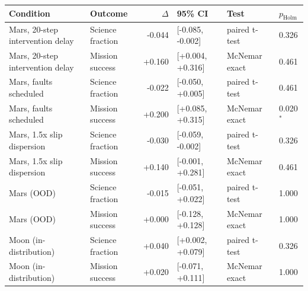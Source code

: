 \begin{tabular}{@{}llr@{~}lll@{}}
\toprule
Condition & Outcome & $\Delta$ & 95\% CI & Test & $p_{\mathrm{Holm}}$ \\
\midrule
Mars, 20-step intervention delay & Science fraction & -0.044 & [-0.085, -0.002] & paired t-test & 0.326 \\
Mars, 20-step intervention delay & Mission success & +0.160 & [+0.004, +0.316] & McNemar exact & 0.461 \\
Mars, faults scheduled & Science fraction & -0.022 & [-0.050, +0.005] & paired t-test & 0.461 \\
Mars, faults scheduled & Mission success & +0.200 & [+0.085, +0.315] & McNemar exact & 0.020$^{*}$ \\
Mars, 1.5x slip dispersion & Science fraction & -0.030 & [-0.059, -0.002] & paired t-test & 0.326 \\
Mars, 1.5x slip dispersion & Mission success & +0.140 & [-0.001, +0.281] & McNemar exact & 0.461 \\
Mars (OOD) & Science fraction & -0.015 & [-0.051, +0.022] & paired t-test & 1.000 \\
Mars (OOD) & Mission success & +0.000 & [-0.128, +0.128] & McNemar exact & 1.000 \\
Moon (in-distribution) & Science fraction & +0.040 & [+0.002, +0.079] & paired t-test & 0.326 \\
Moon (in-distribution) & Mission success & +0.020 & [-0.071, +0.111] & McNemar exact & 1.000 \\
\bottomrule
\end{tabular}
